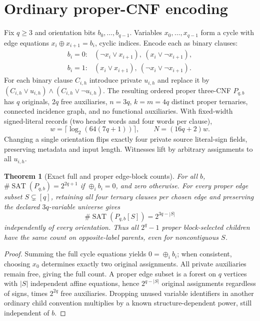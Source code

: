 \documentclass[11pt]{article}
\newtheorem{theorem}{Theorem}
\begin{document}
\section{Ordinary proper-CNF encoding}
Fix $q\ge3$ and orientation bits $b_0,\ldots,b_{q-1}$. Variables $x_0,\ldots,x_{q-1}$ form a cycle with edge equations $x_i\oplus x_{i+1}=b_i$, cyclic indices. Encode each as binary clauses:
\[
\begin{array}{ll}
b_i=0:&(\neg x_i\vee x_{i+1}),\ (x_i\vee\neg x_{i+1}),\\
b_i=1:&(x_i\vee x_{i+1}),\ (\neg x_i\vee\neg x_{i+1}).
\end{array}
\]
For each binary clause $C_{i,h}$ introduce private $u_{i,h}$ and replace it by $(C_{i,h}\vee u_{i,h})\land(C_{i,h}\vee\neg u_{i,h})$. The resulting ordered proper three-CNF $P_{q,b}$ has $q$ originals, $2q$ free auxiliaries, $n=3q$, $k=m=4q$ distinct proper ternaries, connected incidence graph, and no functional auxiliaries. With fixed-width signed-literal records (two header words and four words per clause),
\[
w=\lceil\log_2(64(7q+1))\rceil,\qquad N=(16q+2)w.
\]
Changing a single orientation flips exactly four private source literal-sign fields, preserving metadata and input length. Witnesses lift by arbitrary assignments to all $u_{i,h}$.

\begin{theorem}[Exact full and proper edge-block counts]
For all $b$, $\#\operatorname{SAT}(P_{q,b})=2^{2q+1}$ if $\oplus_i b_i=0$, and zero otherwise. For every proper edge subset $S\subsetneq[q]$, retaining all four ternary clauses per chosen edge and preserving the declared $3q$-variable universe gives
\[
\boxed{\#\operatorname{SAT}(P_{q,b}[S])=2^{3q-|S|}}
\]
independently of every orientation. Thus all $2^q-1$ proper block-selected children have the same count on opposite-label parents, even for noncontiguous $S$.
\end{theorem}
\begin{proof}
Summing the full cycle equations yields $0=\oplus_i b_i$; when consistent, choosing $x_0$ determines exactly two original assignments. All private auxiliaries remain free, giving the full count. A proper edge subset is a forest on $q$ vertices with $|S|$ independent affine equations, hence $2^{q-|S|}$ original assignments regardless of signs, times $2^{2q}$ free auxiliaries. Dropping unused variable identifiers in another ordinary child convention multiplies by a known structure-dependent power, still independent of $b$.
\end{proof}
\end{document}
